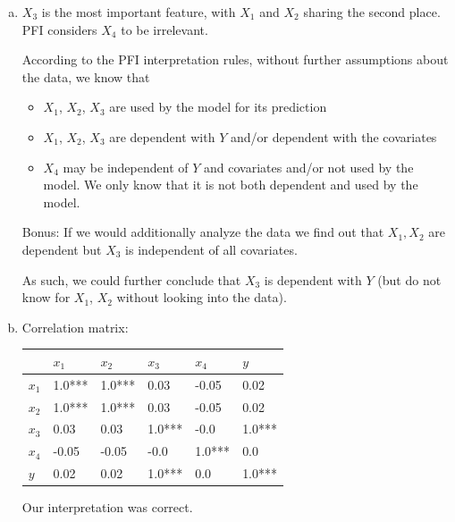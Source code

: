 {\begin{enumerate}[a)]
		Now we apply the method to our model and dataset.
		\begin{algorithm}[H]
			\caption{application}
			\begin{algorithmic}[1]
				\State \texttt{nr\_runs} $\gets$ 10
				\State \texttt{fis\_mean, fis\_std} $\gets$ \texttt{n\_times(nr\_runs, fi\_naive, pfi\_fname, model} prediction function, \texttt{mean\_squared\_error, X\_test, y\_test, return\_raw=False)}
				\State \texttt{plot} bar chart
			\end{algorithmic}
		\end{algorithm}
		
		\item $X_3$ is the most important feature, with $X_1$ and $X_2$ sharing the second place. PFI considers $X_4$ to be irrelevant.
		
		According to the PFI interpretation rules, without further assumptions about the data, we know that
		\begin{itemize}
			\item $X_1$, $X_2$, $X_3$ are used by the model for its prediction
			\item $X_1$, $X_2$, $X_3$ are dependent with $Y$ and/or dependent with the covariates
			\item $X_4$ may be independent of $Y$ and covariates and/or not used by the model. We only know that it is not both dependent and used by the model.
		\end{itemize}
		Bonus: If we would additionally analyze the data we find out that $X_1, X_2$ are dependent but $X_3$ is independent of all covariates.
		
		As such, we could further conclude that $X_3$ is dependent with $Y$ (but do not know for $X_1$, $X_2$ without looking into the data).
		
		\item Correlation matrix: 
		\begin{table}[H]
			\centering
			\begin{tabular}{l|lllll}
				\hline
				& $x_1$ & $x_2$ & $x_3$ & $x_4$ & $y$ \\
				\hline
				$x_1$ &  1.0*** &  1.0*** &  0.03 & -0.05 &  0.02 \\
				$x_2$ &  1.0*** &  1.0*** &  0.03 & -0.05 &  0.02 \\
				$x_3$ &  0.03 &  0.03 &  1.0*** & -0.0 &  1.0*** \\
				$x_4$ & -0.05 & -0.05 & -0.0 &  1.0*** &  0.0 \\
				$y$ &  0.02 &  0.02 &  1.0*** &  0.0 &  1.0*** \\
				\hline
			\end{tabular}
		\end{table}
		Our interpretation was correct.
		

\end{enumerate}}
